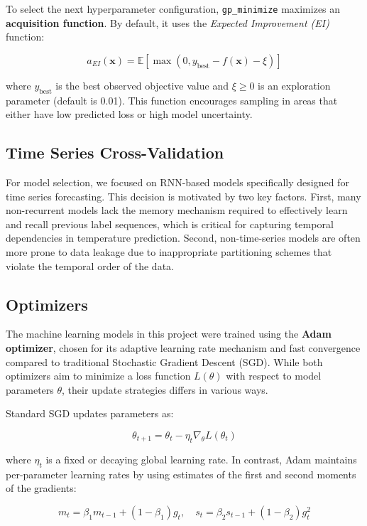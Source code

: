 \documentclass[11pt]{article}
\begin{document}
To select the next hyperparameter configuration, \texttt{gp\_minimize} maximizes an \textbf{acquisition function}. By default, it uses the \textit{Expected Improvement (EI)} function:

\[
a_{EI}(\mathbf{x}) = \mathbb{E}[\max(0, y_{\text{best}} - f(\mathbf{x}) - \xi)]
\]

where \( y_{\text{best}} \) is the best observed objective value and \( \xi \geq 0 \) is an exploration parameter (default is 0.01). This function encourages sampling in areas that either have low predicted loss or high model uncertainty.

\subsection*{Time Series Cross-Validation}

For model selection, we focused on RNN-based models specifically designed for time series forecasting. This decision is motivated by two key factors. First, many non-recurrent models lack the memory mechanism required to effectively learn and recall previous label sequences, which is critical for capturing temporal dependencies in temperature prediction. Second, non-time-series models are often more prone to data leakage due to inappropriate partitioning schemes that violate the temporal order of the data.

\subsection*{Optimizers}

The machine learning models in this project were trained using the \textbf{Adam optimizer}, chosen for its adaptive learning rate mechanism and fast convergence compared to traditional Stochastic Gradient Descent (SGD). While both optimizers aim to minimize a loss function \( L(\theta) \) with respect to model parameters \( \theta \), their update strategies differs in various ways.

Standard SGD updates parameters as:

\[
\theta_{t+1} = \theta_t - \eta_t \nabla_{\theta} L(\theta_t)
\]

where \( \eta_t \) is a fixed or decaying global learning rate. In contrast, Adam maintains per-parameter learning rates by using estimates of the first and second moments of the gradients:

\[
m_t = \beta_1 m_{t-1} + (1 - \beta_1) g_t,\quad s_t = \beta_2 s_{t-1} + (1 - \beta_2) g_t^2
\]
\end{document}

